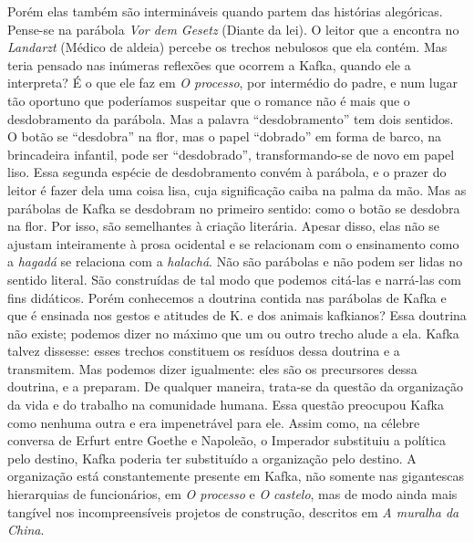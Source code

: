Porém elas também são intermináveis quando partem das histórias
alegóricas. Pense-se na parábola \textit{Vor dem Gesetz} (Diante da lei). O
leitor que a encontra no \textit{Landarzt} (Médico de aldeia) percebe os
trechos nebulosos que ela contém. Mas teria pensado nas inúmeras
reflexões que ocorrem a Kafka, quando ele a interpreta? É o que ele faz
em \textit{O processo}, por intermédio do padre, e num lugar tão oportuno que
poderíamos suspeitar que o romance não é mais que o desdobramento da
parábola. Mas a palavra ``desdobramento'' tem dois sentidos. O botão se
``desdobra'' na flor, mas o papel ``dobrado'' em forma de barco, na
brincadeira infantil, pode ser ``desdobrado'', transformando-se de novo
em papel liso. Essa segunda espécie de desdobramento convém à parábola,
e o prazer do leitor é fazer dela uma coisa lisa, cuja significação
caiba na palma da mão. Mas as parábolas de Kafka se desdobram no
primeiro sentido: como o botão se desdobra na flor. Por isso, são
semelhantes à criação literária. Apesar disso, elas não se ajustam
inteiramente à prosa ocidental e se relacionam com o ensinamento como a
\textit{hagadá} se relaciona com a \textit{halachá}. Não são parábolas e não podem
ser lidas no sentido literal. São construídas de tal modo que podemos
citá-las e narrá-las com fins didáticos. Porém conhecemos a doutrina
contida nas parábolas de Kafka e que é ensinada nos gestos e atitudes de
K. e dos animais kafkianos? Essa doutrina não existe; podemos dizer no
máximo que um ou outro trecho alude a ela. Kafka talvez dissesse: esses
trechos constituem os resíduos dessa doutrina e a transmitem. Mas
podemos dizer igualmente: eles são os precursores dessa doutrina, e a
preparam. De qualquer maneira, trata-se da questão da organização da
vida e do trabalho na comunidade humana. Essa questão preocupou Kafka
como nenhuma outra e era impenetrável para ele. Assim como, na célebre
conversa de Erfurt entre Goethe e Napoleão, o Imperador substituiu a
política pelo destino, Kafka poderia ter substituído a organização pelo
destino. A organização está constantemente presente em Kafka, não
somente nas gigantescas hierarquias de funcionários, em \textit{O processo} e
\textit{O castelo}, mas de modo ainda mais tangível nos incompreensíveis
projetos de construção, descritos em \textit{A muralha da China}.

